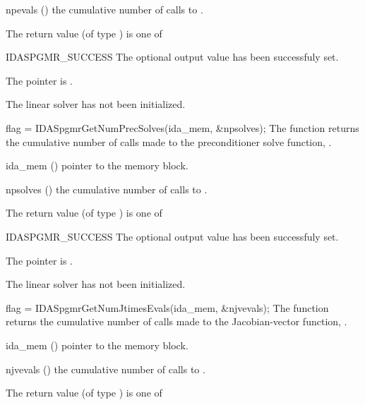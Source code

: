 {{\begin{args}[npevals]
  \item[npevals] ()
    the cumulative number of calls to .
  \end{args}
}
{
  The return value  (of type ) is one of
  \begin{args}
  \item[IDASPGMR\_SUCCESS] 
    The optional output value has been successfuly set.
  \item[\Id{IDASPGMR\_MEM\_NULL}]
    The  pointer is .
  \item[\Id{IDASPGMR\_LMEM\_NULL}]
    The {\idaspgmr} linear solver has not been initialized.
  \end{args}
}
{}
{
  flag = IDASpgmrGetNumPrecSolves(ida\_mem, \&npsolves);
}
{
  The function  returns the
  cumulative number of calls made to the preconditioner 
  solve function, .
}
{
  \begin{args}[npsolves]
  \item[ida\_mem] ()
    pointer to the {\ida} memory block.
  \item[npsolves] ()
    the cumulative number of calls to .
  \end{args}
}
{
  The return value  (of type ) is one of
  \begin{args}
  \item[IDASPGMR\_SUCCESS] 
    The optional output value has been successfuly set.
  \item[\Id{IDASPGMR\_MEM\_NULL}]
    The  pointer is .
  \item[\Id{IDASPGMR\_LMEM\_NULL}]
    The {\idaspgmr} linear solver has not been initialized.
  \end{args}
}
{}
{
  flag = IDASpgmrGetNumJtimesEvals(ida\_mem, \&njvevals);
}
{
  The function  returns the
  cumulative number of calls made to the Jacobian-vector function,
  .
}
{
  \begin{args}[njvevals]
  \item[ida\_mem] ()
    pointer to the {\ida} memory block.
  \item[njvevals] ()
    the cumulative number of calls to .
  \end{args}
}
{
  The return value  (of type ) is one of
}}
